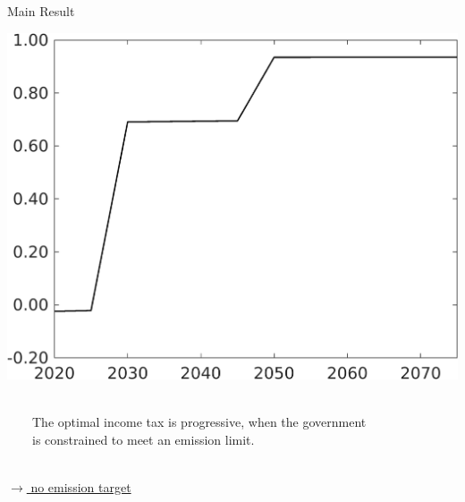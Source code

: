 \documentclass[11pt,aspectratio=169]{beamer}
\begin{document}
\begin{frame}{Main Result}
\begin{minipage}[]{0.32\textwidth}
	\includegraphics[width=1\textwidth]{../codding_model/own_basedOnFried/optimalPol_elastS_DisuSci/figures/all_1705/Single_OPT_T_NoTaus_tauf_spillover0_sep1_BN0_ineq0_red0_etaa0.79.png}
	\end{minipage}

\vspace{5mm}
\begin{block}{}
	\ \\
	\ \ \ \  The optimal income tax is progressive, when the government  \\ \ \ \ \ is constrained to meet an emission limit. \  \ \\ \ 
\end{block}
	\vspace{-3mm}
\hfill
\hyperlink{notopt}{\tiny{$\rightarrow$ no emission target}} 
\hypertarget{backmainres}{}
\end{frame}
\end{document}
